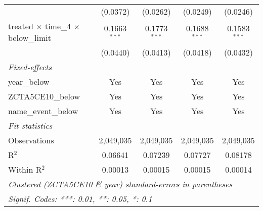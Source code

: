 \begin{tabular}{lcccc}
                                                       & (0.0372)        & (0.0262)        & (0.0249)        & (0.0246)\\   
   treated $\times$ time\_4 $\times$ below\_limit      & 0.1663$^{***}$  & 0.1773$^{***}$  & 0.1688$^{***}$  & 0.1583$^{***}$\\   
                                                       & (0.0440)        & (0.0413)        & (0.0418)        & (0.0432)\\   
   \midrule
   \emph{Fixed-effects}\\
   year\_below                                         & Yes             & Yes             & Yes             & Yes\\  
   ZCTA5CE10\_below                                    & Yes             & Yes             & Yes             & Yes\\  
   name\_event\_below                                  & Yes             & Yes             & Yes             & Yes\\  
   \midrule
   \emph{Fit statistics}\\
   Observations                                        & 2,049,035       & 2,049,035       & 2,049,035       & 2,049,035\\  
   R$^2$                                               & 0.06641         & 0.07239         & 0.07727         & 0.08178\\  
   Within R$^2$                                        & 0.00013         & 0.00015         & 0.00015         & 0.00014\\  
   \midrule \midrule
   \multicolumn{5}{l}{\emph{Clustered (ZCTA5CE10 \& year) standard-errors in parentheses}}\\
   \multicolumn{5}{l}{\emph{Signif. Codes: ***: 0.01, **: 0.05, *: 0.1}}\\
\end{tabular}
\par\endgroup
